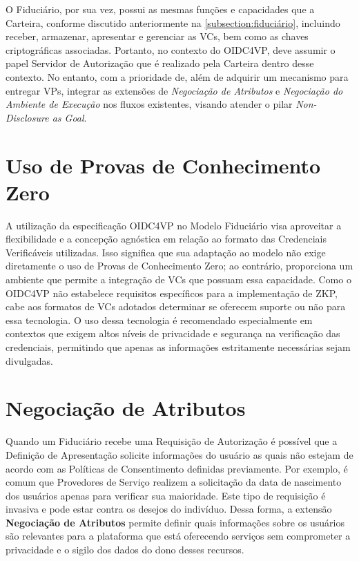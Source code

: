 O Fiduciário, por sua vez, possui as mesmas funções e capacidades que a Carteira, conforme discutido anteriormente na \autoref{subsection:fiduciário}, incluindo receber, armazenar, apresentar e gerenciar as \acs{VC}s, bem como as chaves criptográficas associadas. Portanto, no contexto do \acs{OIDC4VP}, deve assumir o papel Servidor de Autorização que é realizado pela Carteira dentro desse contexto. No entanto, com a prioridade de, além de adquirir um mecanismo para entregar \acs{VP}s, integrar as extensões de \emph{Negociação de Atributos} e \emph{Negociação do Ambiente de Execução} nos fluxos existentes, visando atender o pilar \emph{Non-Disclosure as Goal}.


\section{Uso de Provas de Conhecimento Zero}

A utilização da especificação OIDC4VP no Modelo Fiduciário visa aproveitar a flexibilidade e a concepção agnóstica em relação ao formato das Credenciais Verificáveis utilizadas. Isso significa que sua adaptação ao modelo não exige diretamente o uso de Provas de Conhecimento Zero; ao contrário, proporciona um ambiente que permite a integração de \acs{VC}s que possuam essa capacidade. Como o \acs{OIDC4VP} não estabelece requisitos específicos para a implementação de \acs{ZKP}, cabe aos formatos de \acs{VC}s adotados determinar se oferecem suporte ou não para essa tecnologia. O uso dessa tecnologia é recomendado especialmente em contextos que exigem altos níveis de privacidade e segurança na verificação das credenciais, permitindo que apenas as informações estritamente necessárias sejam divulgadas.

\section{Negociação de Atributos}\label{section:attribute-negotiation}

Quando um Fiduciário recebe uma Requisição de Autorização é possível que a Definição de Apresentação solicite informações do usuário as quais não estejam de acordo com as Políticas de Consentimento definidas previamente. Por exemplo, é comum que Provedores de Serviço realizem a solicitação da data de nascimento dos  usuários apenas para verificar sua maioridade. Este tipo de requisição é invasiva e pode estar contra os desejos do indivíduo. Dessa forma, a extensão \textbf{Negociação de Atributos} permite definir quais informações sobre os usuários são relevantes para a plataforma que está oferecendo serviços sem comprometer a privacidade e o sigilo dos dados do dono desses recursos.


